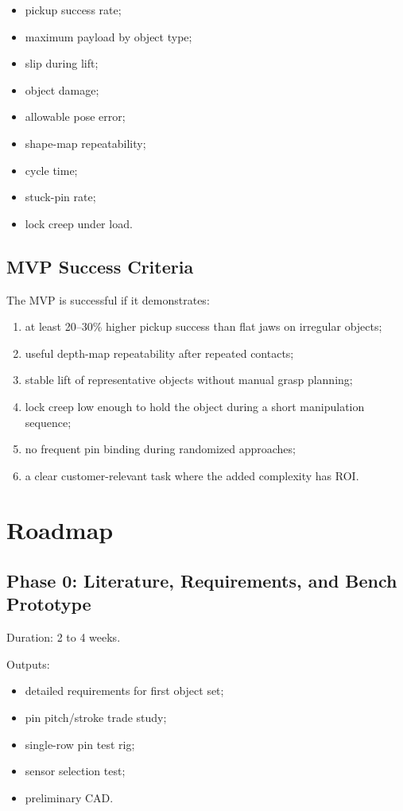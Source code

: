 \documentclass[11pt]{article}
\begin{document}
\begin{itemize}[leftmargin=*]
  \item pickup success rate;
  \item maximum payload by object type;
  \item slip during lift;
  \item object damage;
  \item allowable pose error;
  \item shape-map repeatability;
  \item cycle time;
  \item stuck-pin rate;
  \item lock creep under load.
\end{itemize}

\subsection{MVP Success Criteria}

The MVP is successful if it demonstrates:

\begin{enumerate}[leftmargin=*]
  \item at least 20--30\% higher pickup success than flat jaws on irregular objects;
  \item useful depth-map repeatability after repeated contacts;
  \item stable lift of representative objects without manual grasp planning;
  \item lock creep low enough to hold the object during a short manipulation sequence;
  \item no frequent pin binding during randomized approaches;
  \item a clear customer-relevant task where the added complexity has ROI.
\end{enumerate}

\section{Roadmap}

\subsection{Phase 0: Literature, Requirements, and Bench Prototype}

Duration: 2 to 4 weeks.

Outputs:

\begin{itemize}[leftmargin=*]
  \item detailed requirements for first object set;
  \item pin pitch/stroke trade study;
  \item single-row pin test rig;
  \item sensor selection test;
  \item preliminary CAD.
\end{itemize}
\end{document}
